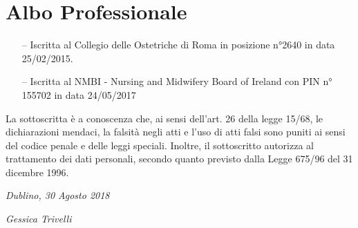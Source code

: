 \documentclass[11pt]{friggeri-cv}
\begin{document}
\section{Albo Professionale}
\begin{itemize}
  \item[--] Iscritta al Collegio delle Ostetriche di Roma in posizione 
  n°2640 in data 
  25/02/2015.
  \item[--] Iscritta al NMBI - Nursing and Midwifery Board of Ireland con PIN n° 
  155702 in data 
  24/05/2017
\end{itemize}

\vspace{75pt}
\footnotesize La sottoscritta è a conoscenza che, ai sensi dell’art. 26 della legge 
15/68, le dichiarazioni mendaci, la falsità negli atti e l’uso di
atti falsi sono puniti ai sensi del codice penale e delle leggi speciali. Inoltre, il 
sottoscritto autorizza al trattamento dei dati
personali, secondo quanto previsto dalla Legge 675/96 del 31 dicembre 1996.

\vspace{75pt}
\begin{flushleft}
\large\emph{Dublino, 30 Agosto 2018}
\end{flushleft}
\begin{flushright}
\large\emph{Gessica Trivelli}
\end{flushright}
\end{document}
